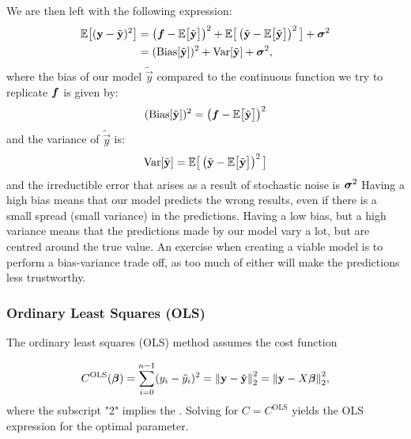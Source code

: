We are then left with the following expression:
\begin{align*}
    \mathbb{E}\big[(\mathbf{y}-\tilde{\mathbf{y}})^2\big] &= \left(\boldsymbol{f}-\mathbb{E}\big[\tilde{\mathbf{y}}\big]\right)^2+ \mathbb{E}\big[\left(\tilde{\mathbf{y}}-\mathbb{E}\big[\tilde{\mathbf{y}}\big]\right)^2\big] + \boldsymbol{\sigma}^2 \\
    &= (\mathrm{Bias}[\tilde{\mathbf{y}}])^2 + \mathrm{Var}[{\tilde{\mathbf{y}}}]+ \boldsymbol{\sigma}^2,
\end{align*}
where the bias of our model $\tilde{\vec{y}}$ compared to the continuous function we try to replicate $\boldsymbol{f}$ is given by:
\begin{align*}
    (\mathrm{Bias}[\tilde{\mathbf{y}}])^2 = \left(\boldsymbol{f}-\mathbb{E}\big[\tilde{\mathbf{y}}\big]\right)^2
\end{align*}
and the variance of $\tilde{\vec{y}}$ is:
\begin{align*}
    \mathrm{Var}[{\tilde{\mathbf{y}}}] = \mathbb{E}\big[\left(\tilde{\mathbf{y}}-\mathbb{E}\big[\tilde{\mathbf{y}}\big]\right)^2\big]
\end{align*}
and the irreductible error that arises as a result of stochastic noise is $\boldsymbol{\sigma}^2$
Having a high bias means that our model predicts the wrong results, even if there is a small spread (small variance) in the predictions. Having a low bias, but a high variance means that the predictions made by our model vary a lot, but are centred around the true value. An exercise when creating a viable model is to perform a bias-variance trade off, as too much of either will make the predictions less trustworthy. 







\subsubsection{Ordinary Least Squares (OLS)}\label{sec:OLS}

The ordinary least squares (OLS) method assumes the cost function

\begin{align*}
    C^\text{OLS}(\boldsymbol{\beta}) = \sum_{i=0}^{n-1}(y_i - \tilde{y}_i)^2 =  \norm{\mathbf{y}-\tilde{\mathbf{y}}}_2^{2} = \norm{\mathbf{y}-X\boldsymbol{\beta}}_2^{2},
\end{align*}
where the subscript "2" implies the \footnotemark. Solving  for $C=C^\text{OLS}$ yields the OLS expression for the optimal parameter.

